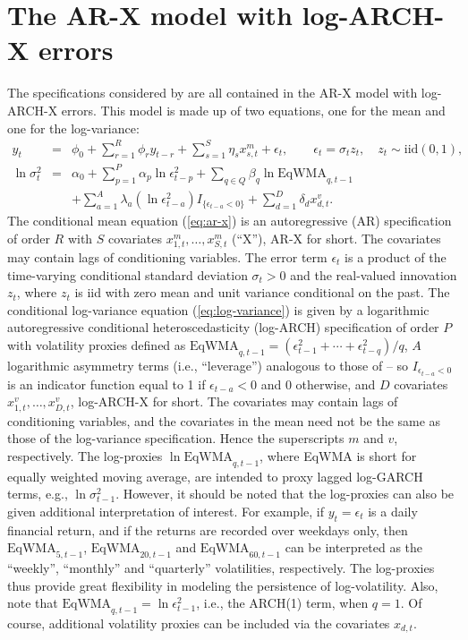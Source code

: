 \documentclass[article,nojss]{jss}
\begin{document}
\section{The AR-X model with log-ARCH-X errors}
\label{sec:ar-x:model:with:log-arch-x:errors}

The specifications considered by  are all contained in the AR-X model with log-ARCH-X errors. This model is made up of two equations, one for the mean and one for the log-variance:
%
\begin{eqnarray}
	y_t &=& \phi_0 + \sum_{r=1}^R \phi_r y_{t-r} + \sum_{s=1}^S\eta_s x_{s,t}^m + \epsilon_t, \qquad \epsilon_t = \sigma_tz_t, \quad z_t \sim \text{iid}(0,1), \label{eq:ar-x} \\
	\nonumber \ln\sigma_t^2 &=& \alpha_0 + \sum_{p=1}^P \alpha_p \ln\epsilon_{t-p}^2 + \sum_{q\in Q} \beta_q \ln \text{EqWMA}_{q,t-1} \\
	&& + \sum_{a=1}^A \lambda_a(\ln\epsilon_{t-a}^2)I_{\{\epsilon_{t-a} < 0\}} + \sum_{d=1}^D\delta_d x_{d,t}^v. \label{eq:log-variance}
\end{eqnarray}
%
The conditional mean equation (\ref{eq:ar-x}) is an autoregressive
(AR) specification of order $R$ with $S$ covariates
$x_{1,t}^m, \ldots, x_{S,t}^m$ (``X''), AR-X for short. The covariates
may contain lags of conditioning variables. The error term
$\epsilon_t$ is a product of the time-varying conditional standard
deviation $\sigma_t > 0$ and the real-valued innovation $z_t$, where
$z_t$ is iid with zero mean and unit variance conditional on the
past. The conditional log-variance equation (\ref{eq:log-variance}) is
given by a logarithmic autoregressive conditional heteroscedasticity
(log-ARCH) specification of order $P$ with volatility proxies defined
as $\text{EqWMA}_{q,t-1} = (\epsilon_{t-1}^2 + \cdots + \epsilon_{t-q}^2)/q$,
$A$ logarithmic asymmetry terms (i.e., ``leverage'') analogous to those
of \cite{GlostenJagannathanRunkle1993} -- so $I_{\epsilon_{t-a} < 0}$
is an indicator function equal to 1 if $\epsilon_{t-a} < 0$ and 0
otherwise, and $D$ covariates $x_{1,t}^v, \ldots, x_{D,t}^v$,
log-ARCH-X for short. The covariates may contain lags of conditioning
variables, and the covariates in the mean need not be the same as
those of the log-variance specification. Hence the superscripts $m$
and $v$, respectively. The log-proxies $\ln \text{EqWMA}_{q,t-1}$, where
EqWMA is short for equally weighted moving average, are intended to
proxy lagged log-GARCH terms, e.g., $\ln\sigma_{t-1}^2$. However, it
should be noted that the log-proxies can also be given additional
interpretation of interest. For example, if $y_t=\epsilon_t$ is a
daily financial return, and if the returns are recorded over weekdays
only, then $\text{EqWMA}_{5,t-1}$, $\text{EqWMA}_{20,t-1}$ and $\text{EqWMA}_{60,t-1}$ can
be interpreted as the ``weekly'', ``monthly'' and ``quarterly''
volatilities, respectively. The log-proxies thus provide great
flexibility in modeling the persistence of log-volatility. Also, note
that $\text{EqWMA}_{q,t-1} = \ln\epsilon_{t-1}^2$, i.e., the ARCH(1) term,
when $q=1$. Of course, additional volatility proxies can be included
via the covariates $x_{d,t}$.
\end{document}
